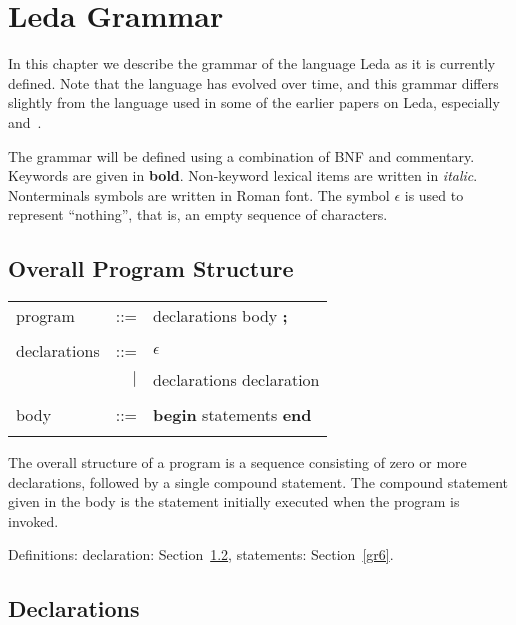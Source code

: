 \chapter{Leda Grammar}\label{gr0}

In this chapter we describe the grammar of the language Leda as it
is currently defined.
Note that the language has evolved over time,
and this grammar differs slightly from the language used in some of
the earlier papers on Leda, especially~\cite{blend} and~\cite{ledadata}.

The grammar will be defined using a combination of BNF and commentary.
Keywords are given in {\bf bold}.  Non-keyword lexical items are
written in {\em italic}.  Nonterminals symbols are written in Roman font.
The symbol $\epsilon$ is used to represent ``nothing'', that is,
an empty sequence of characters.

\section{Overall Program Structure}\label{gr1}

\begin{tabular}{l r l}
program & ::= & declarations body {\bf ;} \\ \\

declarations & ::= & $\epsilon$ \\
& $\mid$ & declarations declaration \\ \\

body & ::= & {\bf begin} statements {\bf end} \\ \\
\end{tabular}

The overall structure of a program is a sequence consisting of zero or more
declarations, followed by a single compound statement.  The compound
statement given in the body is the
statement initially executed when the program is invoked.

Definitions: declaration: Section~\ref{gr2}, statements: Section~\ref{gr6}.

\section{Declarations}\label{gr2}

